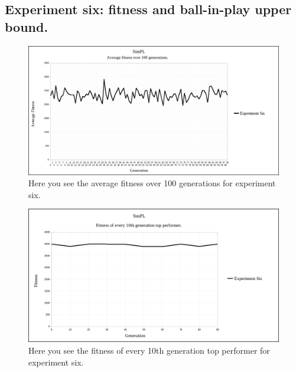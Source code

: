 \documentclass[a4paper,10pt]{article}
\begin{document}
\subsection{Experiment six: fitness and ball-in-play upper bound.}

\begin{figure}[H]  
  \centering
  \includegraphics[width=1\textwidth]{figures/exp6_avg_fit.png}
  \caption{Here you see the average fitness over 100 generations for experiment six.}
  \label{fig:exp6_avg_fit}
\end{figure}

\begin{figure}[H]  
  \centering
  \includegraphics[width=1\textwidth]{figures/exp6_10_tops.png}
  \caption{Here you see the fitness of every 10th generation top performer for experiment six.}
  \label{fig:exp6_10_tops}
\end{figure}
\end{document}
